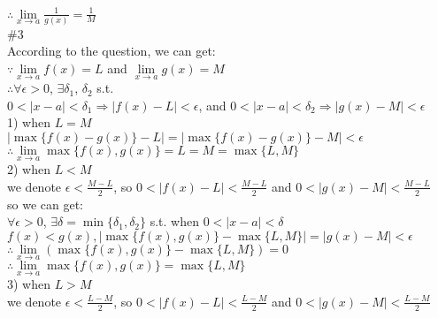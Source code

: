 \documentclass{article}
\begin{document}
$\therefore$\qquad$\lim \limits_{x \to a}\displaystyle\frac{1}{g(x)}=\frac{1}{M}$\\

\textcolor[rgb]{0.00,0.00,0.50}{\#3}\\

According to the question, we can get:\\

$\because$\qquad$\lim \limits_{x \to a}f(x)=L$ and $\lim \limits_{x \to a}g(x)=M$\\

$\therefore$\qquad$\forall\epsilon>0$, $\exists\delta_1$, $\delta_2$ s.t.\\

$0<|x-a|<\delta_1\Rightarrow|f(x)-L|<\epsilon$, and $0<|x-a|<\delta_2\Rightarrow|g(x)-M|<\epsilon$\\

1) when $L=M$\\

$|\max\{f(x)-g(x)\}-L|=|\max\{f(x)-g(x)\}-M|<\epsilon$\\

$\therefore$\qquad$\lim \limits_{x \to a}\max\{f(x),g(x)\}=L=M=\max\{L,M\}$\\

2) when $L<M$\\

we denote $\epsilon<\displaystyle\frac{M-L}{2}$, so $0<|f(x)-L|<\displaystyle\frac{M-L}{2}$ and $0<|g(x)-M|<\displaystyle\frac{M-L}{2}$\\

so we can get:\\

$\forall\epsilon>0$, $\exists\delta=\min\{\delta_1,\delta_2\}$ s.t. when $0<|x-a|<\delta$\\

$f(x)<g(x), |\max\{f(x),g(x)\}-\max\{L,M\}|=|g(x)-M|<\epsilon$\\

$\therefore$\qquad$\lim \limits_{x \to a}\left(\max\{f(x),g(x)\}-\max\{L,M\}\right)=0$\\

$\therefore$\qquad$\lim \limits_{x \to a}\max\{f(x),g(x)\}=\max\{L,M\}$\\

3) when $L>M$\\

we denote $\epsilon<\displaystyle\frac{L-M}{2}$, so $0<|f(x)-L|<\displaystyle\frac{L-M}{2}$ and $0<|g(x)-M|<\displaystyle\frac{L-M}{2}$\\
\end{document}
